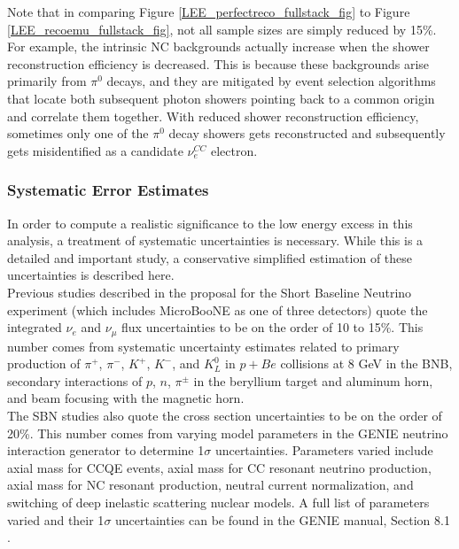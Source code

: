 Note that in comparing Figure \ref{LEE_perfectreco_fullstack_fig} to Figure \ref{LEE_recoemu_fullstack_fig}, not all sample sizes are simply reduced by 15\%. For example, the intrinsic NC backgrounds actually increase when the shower reconstruction efficiency is decreased. This is because these backgrounds arise primarily from $\pi^0$ decays, and they are mitigated by event selection algorithms that locate both subsequent photon showers pointing back to a common origin and correlate them together. With reduced shower reconstruction efficiency, sometimes only one of the $\pi^0$ decay showers gets reconstructed and subsequently gets misidentified as a candidate $\nu_e^{CC}$ electron.

\subsubsection{Systematic Error Estimates}

In order to compute a realistic significance to the low energy excess in this analysis, a treatment of systematic uncertainties is necessary. While this is a detailed and important study, a conservative simplified estimation of these uncertainties is described here.\\

Previous studies described in the proposal for the Short Baseline Neutrino experiment (which includes MicroBooNE as one of three detectors) \cite{SBNproposal} quote the integrated $\nu_e$ and $\nu_\mu$ flux uncertainties to be on the order of 10 to 15\%. This number comes from systematic uncertainty estimates related to primary production of $\pi^+$, $\pi^-$, $K^+$, $K^-$, and $K^0_L$ in $p+Be$ collisions at 8 GeV in the BNB, secondary interactions of $p$, $n$, $\pi^\pm$ in the beryllium target and aluminum horn, and beam focusing with the magnetic horn.\\

The SBN studies also quote the cross section uncertainties to be on the order of 20\%. This number comes from varying model parameters in the GENIE neutrino interaction generator to determine 1$\sigma$ uncertainties. Parameters varied include axial mass for CCQE events, axial mass for CC resonant neutrino production, axial mass for NC resonant production, neutral current normalization, and switching of deep inelastic scattering nuclear models. A full list of parameters varied and their 1$\sigma$ uncertainties can be found in the GENIE manual, Section 8.1 \cite{GENIEsource}.\\

